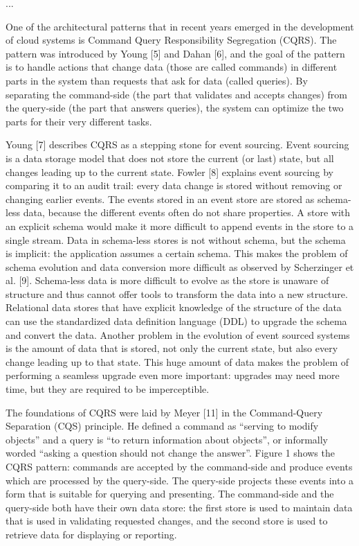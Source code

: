 

...\citep{young2010cqrs}

One of the architectural patterns that in recent years emerged in the development of cloud systems is Command Query Responsibility Segregation (CQRS). The pattern was introduced by Young [5] and Dahan [6], and the goal of the pattern is to handle actions that change data (those are called commands) in different parts in the system than requests that ask for data (called queries). By separating the command-side (the part that validates and accepts changes) from the query-side (the part that answers queries), the system can optimize the two parts for their very different tasks.

Young [7] describes CQRS as a stepping stone for event sourcing. Event sourcing is a data storage model that does not store the current (or last) state, but all changes leading up to the current state. Fowler [8] explains event sourcing by comparing it to an audit trail: every data change is stored without removing or changing earlier events. The events stored in an event store are stored as schema-less data, because the different events often do not share properties. A store with an explicit schema would make it more difficult to append events in the store to a single stream. Data in schema-less stores is not without schema, but the schema is implicit: the application assumes a certain schema. This makes the problem of schema evolution and data conversion more difficult as observed by Scherzinger et al. [9]. Schema-less data is more difficult to evolve as the store is unaware of structure and thus cannot offer tools to transform the data into a new structure. Relational data stores that have explicit knowledge of the structure of the data can use the standardized data definition language (DDL) to upgrade the schema and convert the data. Another problem in the evolution of event sourced systems is the amount of data that is stored, not only the current state, but also every change leading up to that state. This huge amount of data makes the problem of performing a seamless upgrade even more important: upgrades may need more time, but they are required to be imperceptible.

The foundations of CQRS were laid by Meyer [11] in the Command-Query Separation (CQS) principle. He defined a command as “serving to modify objects” and a query is “to return information about objects”, or informally worded “asking a question should not change the answer”. Figure 1 shows the CQRS pattern: commands are accepted by the command-side and produce events which are processed by the query-side. The query-side projects these events into a form that is suitable for querying and presenting. The command-side and the query-side both have their own data store: the first store is used to maintain data that is used in validating requested changes, and the second store is used to retrieve data for displaying or reporting.

